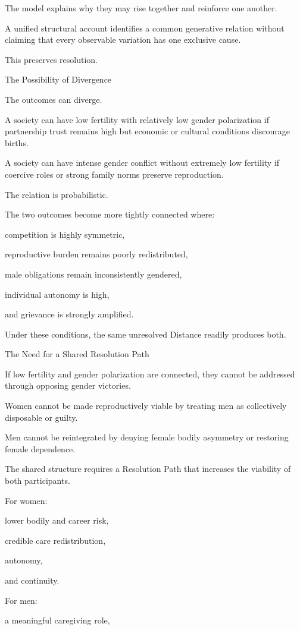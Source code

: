The model explains why they may rise together and reinforce one another.

A unified structural account identifies a common generative relation without claiming that every observable variation has one exclusive cause.

This preserves resolution.

The Possibility of Divergence

The outcomes can diverge.

A society can have low fertility with relatively low gender polarization if partnership trust remains high but economic or cultural conditions discourage births.

A society can have intense gender conflict without extremely low fertility if coercive roles or strong family norms preserve reproduction.

The relation is probabilistic.

The two outcomes become more tightly connected where:

competition is highly symmetric,

reproductive burden remains poorly redistributed,

male obligations remain inconsistently gendered,

individual autonomy is high,

and grievance is strongly amplified.

Under these conditions, the same unresolved Distance readily produces both.

The Need for a Shared Resolution Path

If low fertility and gender polarization are connected, they cannot be addressed through opposing gender victories.

Women cannot be made reproductively viable by treating men as collectively disposable or guilty.

Men cannot be reintegrated by denying female bodily asymmetry or restoring female dependence.

The shared structure requires a Resolution Path that increases the viability of both participants.

For women:

lower bodily and career risk,

credible care redistribution,

autonomy,

and continuity.

For men:

a meaningful caregiving role,

